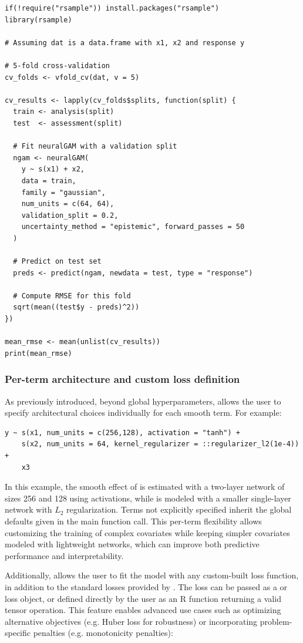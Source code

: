 \begin{Verbatim}
if(!require("rsample")) install.packages("rsample")
library(rsample)

# Assuming dat is a data.frame with x1, x2 and response y

# 5-fold cross-validation
cv_folds <- vfold_cv(dat, v = 5)

cv_results <- lapply(cv_folds$splits, function(split) {
  train <- analysis(split)
  test  <- assessment(split)

  # Fit neuralGAM with a validation split
  ngam <- neuralGAM(
    y ~ s(x1) + x2,
    data = train,
    family = "gaussian",
    num_units = c(64, 64),
    validation_split = 0.2,
    uncertainty_method = "epistemic", forward_passes = 50
  )

  # Predict on test set
  preds <- predict(ngam, newdata = test, type = "response")

  # Compute RMSE for this fold
  sqrt(mean((test$y - preds)^2))
})

mean_rmse <- mean(unlist(cv_results))
print(mean_rmse)
\end{Verbatim}

\subsubsection{Per-term architecture and custom loss definition} \label{per-term-arch}
As previously introduced, beyond global hyperparameters,  allows the user to specify architectural choices individually for each smooth term. For example:
\begin{Verbatim}
y ~ s(x1, num_units = c(256,128), activation = "tanh") +
    s(x2, num_units = 64, kernel_regularizer = ::regularizer_l2(1e-4)) +
    x3
\end{Verbatim}

In this example, the smooth effect of  is estimated with a two-layer network of sizes 256 and 128 using  activations, while  is modeled with a smaller single-layer network with $L_2$ regularization. Terms not explicitly specified inherit the global defaults given in the main function call. This per-term flexibility allows customizing the training of complex covariates while keeping simpler covariates modeled with lightweight networks, which can improve both predictive performance and interpretability.

Additionally,  allows the user to fit the model with any custom-built loss function, in addition to the standard losses provided by . The loss can be passed as a  or  loss object, or defined directly by the user as an \textsf{R} function returning a valid tensor operation. This feature enables advanced use cases such as optimizing alternative objectives (e.g. Huber loss for robustness) or incorporating problem-specific penalties (e.g. monotonicity penalties):

